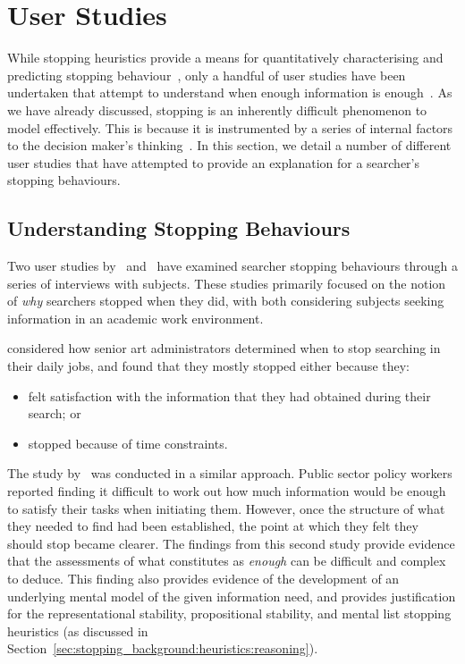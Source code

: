 \section{User Studies}\label{sec:stopping_background:user_studies}
While stopping heuristics provide a means for quantitatively characterising and predicting stopping behaviour~\citep{wu2014information_scent}, only a handful of user studies have been undertaken that attempt to understand when enough information is enough~\citep{zach2005enough_is_enough}. As we have already discussed, stopping is an inherently difficult phenomenon to model effectively. This is because it is instrumented by a series of internal factors to the decision maker's thinking~\citep{nickles1995judgment}. In this section, we detail a number of different user studies that have attempted to provide an explanation for a searcher's stopping behaviours.

\subsection{Understanding Stopping Behaviours}
Two user studies by~\cite{zach2005enough_is_enough} and~\cite{berryman2006defines} have examined searcher stopping behaviours through a series of interviews with subjects. These studies primarily focused on the notion of \emph{why} searchers stopped when they did, with both considering subjects seeking information in an academic work environment.

\cite{zach2005enough_is_enough} considered how senior art administrators determined when to stop searching in their daily jobs, and found that they mostly stopped either because they:

\begin{itemize}
    \item{felt satisfaction with the information that they had obtained during their search; or}
    \item{stopped because of time constraints.}
\end{itemize}

The study by~\cite{berryman2006defines} was conducted in a similar approach. Public sector policy workers reported finding it difficult to work out how much information would be enough to satisfy their tasks when initiating them. However, once the structure of what they needed to find had been established, the point at which they felt they should stop became clearer. The findings from this second study provide evidence that the assessments of what constitutes as \emph{enough} can be difficult and complex to deduce. This finding also provides evidence of the development of an underlying mental model of the given information need, and provides justification for the representational stability, propositional stability, and mental list stopping heuristics (as discussed in Section~\ref{sec:stopping_background:heuristics:reasoning}).

